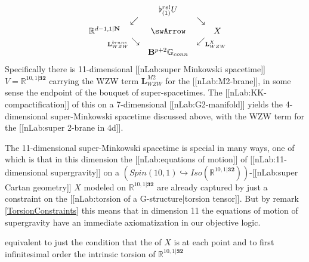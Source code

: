 \documentclass[12pt,titlepage]{article}
\def\mathllap{\mathpalette\mathllapinternal}
\def\mathrlap{\mathpalette\mathrlapinternal}
\def\mathllapinternal#1#2{\llap{$\mathsurround=0pt#1{#2}$}}
\def\mathrlapinternal#1#2{\rlap{$\mathsurround=0pt#1{#2}$}}
\newcommand{\itexarray}[1]{\begin{matrix}#1\end{matrix}}
\theoremstyle{plain}
\theoremstyle{definition}
\theoremstyle{remark}
\begin{document}
\begin{displaymath}
\itexarray{
     && \flat^{rel}_{(1)} U
     \\
     & \swarrow && \searrow
     \\
     \mathbb{R}^{d-1,1|\mathbf{N}}
     && \swArrow &&
     X
     \\
     & {}_{\mathllap{\mathbf{L}_{WZW}^{brane}}}\searrow && \swarrow_{\mathrlap{\mathbf{L}_{WZW}^X}}
     \\
     && \mathbf{B}^{p+2}\mathbb{G}_{conn}
  }
\end{displaymath}
Specifically there is 11-dimensional [[nLab:super Minkowski spacetime]] $V = \mathbb{R}^{10,1\vert \mathbf{32}}$ carrying the WZW term $\mathbf{L}_{WZW}^{M2}$ for the [[nLab:M2-brane]], in some sense the endpoint of the bouquet of super-spacetimes. The [[nLab:KK-compactification]] of this on a 7-dimensional [[nLab:G2-manifold]] yields the 4-dimensional super-Minkowski spacetime discussed above, with the WZW term for the [[nLab:super 2-brane in 4d]].

The 11-dimensional super-Minkowski spacetime is special in many ways, one of which is that in this dimension the [[nLab:equations of motion]] of [[nLab:11-dimensional supergravity]] on a $(Spin(10,1)\hookrightarrow Iso(\mathbb{R}^{10,1\vert \mathbf{32}}))$-[[nLab:super Cartan geometry]] $X$ modeled on $\mathbb{R}^{10,1\vert \mathbf{32}}$ are already captured by just a constraint on the [[nLab:torsion of a G-structure|torsion tensor]]. But by remark \ref{TorsionConstraints} this means that in dimension 11 the equations of motion of supergravity have an immediate axiomatization in our objective logic.

equivalent to just the condition that the of $X$ is at each point and to first infinitesimal order the intrinsic torsion of $\mathbb{R}^{10,1\vert \mathbf{32}}$
\end{document}
